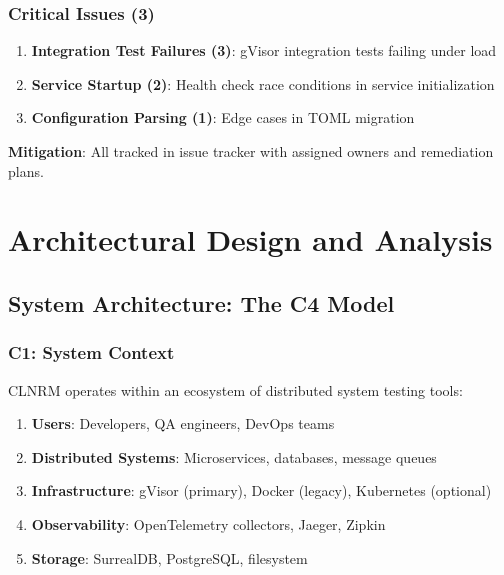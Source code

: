 \documentclass[12pt,twoside,openright]{book}
\theoremstyle{plain}
\theoremstyle{definition}
\theoremstyle{remark}
\begin{document}
\section{Critical Issues (3)}

\begin{enumerate}
  \item \textbf{Integration Test Failures (3)}: gVisor integration tests failing under load
  \item \textbf{Service Startup (2)}: Health check race conditions in service initialization
  \item \textbf{Configuration Parsing (1)}: Edge cases in TOML migration
\end{enumerate}

\textbf{Mitigation}: All tracked in issue tracker with assigned owners and remediation plans.


\part{Architectural Design and Analysis}

\chapter{System Architecture: The C4 Model}

\section{C1: System Context}

CLNRM operates within an ecosystem of distributed system testing tools:

\begin{enumerate}
  \item \textbf{Users}: Developers, QA engineers, DevOps teams
  \item \textbf{Distributed Systems}: Microservices, databases, message queues
  \item \textbf{Infrastructure}: gVisor (primary), Docker (legacy), Kubernetes (optional)
  \item \textbf{Observability}: OpenTelemetry collectors, Jaeger, Zipkin
  \item \textbf{Storage}: SurrealDB, PostgreSQL, filesystem
\end{enumerate}
\end{document}
